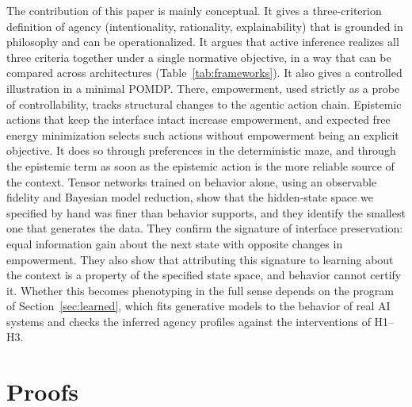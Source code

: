 \documentclass[letterpaper]{article} %
\theoremstyle{definition}
\begin{document}
The contribution of this paper is mainly conceptual. It gives a three-criterion definition of agency (intentionality, rationality, explainability) that is grounded in philosophy and can be operationalized. It argues that active inference realizes all three criteria together under a single normative objective, in a way that can be compared across architectures (Table~\ref{tab:frameworks}). It also gives a controlled illustration in a minimal POMDP. There, empowerment, used strictly as a probe of controllability, tracks structural changes to the agentic action chain. Epistemic actions that keep the interface intact increase empowerment, and expected free energy minimization selects such actions without empowerment being an explicit objective. It does so through preferences in the deterministic maze, and through the epistemic term as soon as the epistemic action is the more reliable source of the context. Tensor networks trained on behavior alone, using an observable fidelity and Bayesian model reduction, show that the hidden-state space we specified by hand was finer than behavior supports, and they identify the smallest one that generates the data. They confirm the signature of interface preservation: equal information gain about the next state with opposite changes in empowerment. They also show that attributing this signature to learning about the context is a property of the specified state space, and behavior cannot certify it. Whether this becomes phenotyping in the full sense depends on the program of Section~\ref{sec:learned}, which fits generative models to the behavior of real AI systems and checks the inferred agency profiles against the interventions of H1--H3.

\newpage


\appendix
\section{Proofs}\label{app:proofs}
\end{document}
